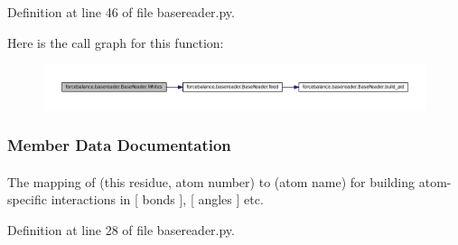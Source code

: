 \-Definition at line 46 of file basereader.\-py.



\-Here is the call graph for this function\-:\nopagebreak
\begin{figure}[H]
\begin{center}
\leavevmode
\includegraphics[width=350pt]{classforcebalance_1_1basereader_1_1BaseReader_a2819ab1e523b6ff8e7467e56e3582386_cgraph}
\end{center}
\end{figure}




\subsubsection{\-Member \-Data \-Documentation}
\hypertarget{classforcebalance_1_1basereader_1_1BaseReader_a6c8914290178fd67fbe6a0753f9235f4}{
\paragraph[{adict}]{}}\label{classforcebalance_1_1basereader_1_1BaseReader_a6c8914290178fd67fbe6a0753f9235f4}


\-The mapping of (this residue, atom number) to (atom name) for building atom-\/specific interactions in \mbox{[} bonds \mbox{]}, \mbox{[} angles \mbox{]} etc. 



\-Definition at line 28 of file basereader.\-py.

\hypertarget{classforcebalance_1_1basereader_1_1BaseReader_a1c52efffef2504be2fe3fc0bacc71a62}{
\paragraph[{\-Atom\-Types}]{}}\label{classforcebalance_1_1basereader_1_1BaseReader_a1c52efffef2504be2fe3fc0bacc71a62}


